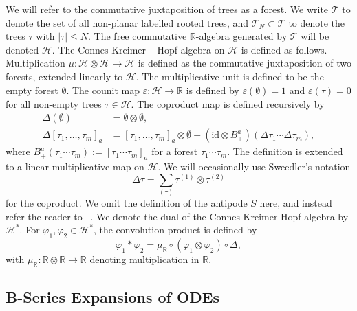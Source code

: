 \documentclass{article} %
\theoremstyle{definition}
\theoremstyle{remark}
\begin{document}
We will refer to the commutative juxtaposition of trees as a forest. We write $\mathcal{T}$ to denote the set of all non-planar labelled rooted trees, and $\mathcal{T}_N \subset \mathcal{T}$ to denote the trees $\tau$ with $|\tau| \leq N$. The free commutative $\mathbb{R}$-algebra generated by $\mathcal{T}$ will be denoted $\mathcal{H}$. The Connes-Kreimer ~\citep{connes1999hopf} Hopf algebra on $\mathcal{H}$ is defined as follows. Multiplication $\mu : \mathcal{H} \otimes \mathcal{H} \to \mathcal{H}$ is defined as the commutative juxtaposition of two forests, extended linearly to $\mathcal{H}$. The multiplicative unit is defined to be the empty forest $\emptyset$. The counit map $\varepsilon: \mathcal{H} \to \mathbb{R}$ is defined by $\varepsilon(\emptyset) = 1$ and $\varepsilon(\tau) = 0$ for all non-empty trees $\tau \in \mathcal{H}$. The coproduct map is defined recursively by
\begin{align*}
    \Delta(\emptyset) &= \emptyset \otimes \emptyset,\\
    \Delta [\tau_1, \ldots, \tau_m]_a &= [\tau_1, \ldots, \tau_m]_a \otimes \emptyset + (\mathrm{id} \otimes B^a_+)(\Delta \tau_1 \cdots \Delta \tau_m),
\end{align*}
where $B^a_+(\tau_1 \cdots \tau_m) := [\tau_1 \cdots \tau_m]_a$ for a forest $\tau_1 \cdots \tau_m$. The definition is extended to a linear multiplicative map on $\mathcal{H}$. We will occasionally use Sweedler's notation
\begin{equation*}
    \Delta \tau = \sum_{(\tau)} \tau^{(1)} \otimes \tau^{(2)}
\end{equation*}
for the coproduct. We omit the definition of the antipode $S$ here, and instead refer the reader to ~\citep{manchon2004hopf, hoffman2003hopf}. We denote the dual of the Connes-Kreimer Hopf algebra by $\mathcal{H}^*$. For $\varphi_1, \varphi_2 \in \mathcal{H}^*$, the convolution product is defined by
\begin{equation*}
    \varphi_1 * \varphi_2 = \mu_\mathbb{R} \circ (\varphi_1 \otimes \varphi_2) \circ \Delta,
\end{equation*}
with $\mu_\mathbb{R} : \mathbb{R} \otimes \mathbb{R} \to \mathbb{R}$ denoting multiplication in $\mathbb{R}$.

\subsection{B-Series Expansions of ODEs}\label{appendix:b_series_ode}
\end{document}
